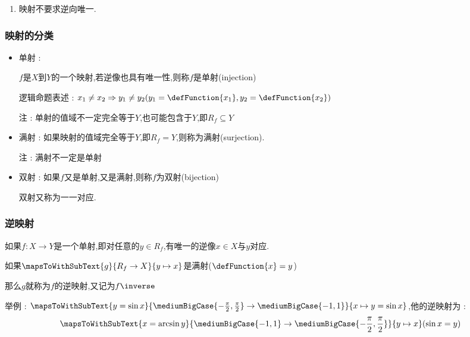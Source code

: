{{{{\begin{enumerate}
{                  但是可以稍作改造:对$Y = \mathRealNumberCollection$做限制,令$Y = R^-$,此时 : $$
                      \mapsToWithSubText{f}{X \to Y}{x \mapsto y}(y^2 = x)
                  $$
                  就构成了一个映射
                  }
            \item {
                  映射不要求逆向唯一.
                  }
        \end{enumerate}
    }%

    \subsubsection{映射的分类}{
        \begin{itemize}
            \item {
                  单射 :

                  $f$是$X$到$Y$的一个映射,若逆像也具有唯一性,则称$f$是单射(injection)

                  逻辑命题表述 : $x_1 \neq x_2 \Rightarrow y_1 \neq y_2(y_1 = \defFunction{x_1},y_2 = \defFunction{x_2})$

                  注 : 单射的值域不一定完全等于$Y$,也可能包含于$Y$,即$R_f \subseteq Y$
                  }
            \item {
                  满射 : 如果映射的值域完全等于$Y$,即$R_f = Y$,则称为满射(surjection).

                  注 : 满射不一定是单射
                  }
            \item {
                  双射 : 如果$f$又是单射,又是满射,则称$f$为双射(bijection)

                  双射又称为一一对应.
                  }
        \end{itemize}
    }%

    \subsubsection{逆映射}{
        如果$f : X \to Y$是一个单射,即对任意的$y \in R_f$,有唯一的逆像$x \in X$与$y$对应.

        如果$\mapsToWithSubText{g}{R_f \to X}{y \mapsto x}$是满射($\defFunction{x} = y$)

        那么$g$就称为$f$的逆映射,又记为$f\inverse$

        举例 : $\mapsToWithSubText{y = \sin x}{\mediumBigCase{-\frac{\pi}{2},\frac{\pi}{2}} \to \mediumBigCase{-1,1}}{x \mapsto y = \sin x}$,他的逆映射为 : $$
            \mapsToWithSubText{x = \arcsin y}{\mediumBigCase{-1,1} \to \mediumBigCase{-\frac{\pi}{2},\frac{\pi}{2}}}{y \mapsto x}(\sin x = y)
        $$
    }%

}}}
